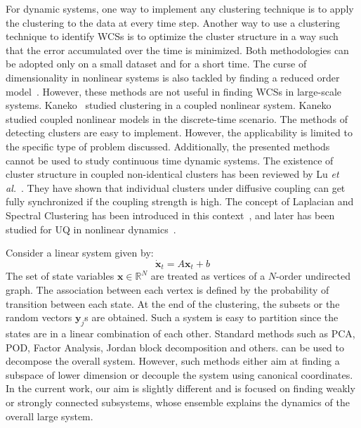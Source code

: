 For dynamic systems, one way to implement any clustering technique is to apply the clustering to the data at every time step. Another way to use a clustering technique to identify WCSs is to optimize the cluster structure in a way such that the error accumulated over the time is minimized. Both methodologies can be adopted only on a small dataset and for a short time. The curse of dimensionality in nonlinear systems is also tackled by finding a reduced order model~\cite{calinski1974dendrite,matthies2003nonlinear,wang2011two,carlberg2013gnat}. However, these methods are not useful in finding WCSs in large-scale systems. Kaneko~\cite{kaneko1990clustering,kaneko1990globally} studied clustering in a coupled nonlinear system. Kaneko studied coupled nonlinear models in the discrete-time scenario. The methods of detecting clusters are easy to implement. However, the applicability is limited to the specific type of problem discussed. Additionally, the presented methods cannot be used to study continuous time dynamic systems. The existence of cluster structure in coupled non-identical clusters has been reviewed by Lu \textit{et al.}~\cite{lu2010cluster}. They have shown that individual clusters under diffusive coupling can get fully synchronized if the coupling strength is high. The concept of Laplacian and Spectral Clustering has been introduced in this context~\cite{dellnitz2003congestion, varigonda2004graph}, and later has been studied for UQ in nonlinear dynamics~\cite{xia2011clustering,surana2012iterative, sorrentino2015complete}. 

Consider a linear system given by:
\begin{equation}
\label{lindiffeqn}
\dot{\mathbf{x}}_t = A \mathbf{x}_t + b
\end{equation}
The set of state variables $\textbf{x} \in \mathbb{R}^N$ are treated as vertices of a $N$-order undirected graph.  The association between each vertex is defined by the probability of transition between each state. At the end of the clustering, the subsets or the random vectors $\mathbf{y}_j$s are obtained. 
Such a system is easy to partition since the states are in a linear combination of each other. Standard methods such as PCA, POD, Factor Analysis, Jordan block decomposition and others. can be used to decompose the overall system. However, such methods either aim at finding a subspace of lower dimension or decouple the system using canonical coordinates. In the current work, our aim is slightly different and is focused on finding weakly or strongly connected subsystems, whose ensemble explains the dynamics of the overall large system.  

